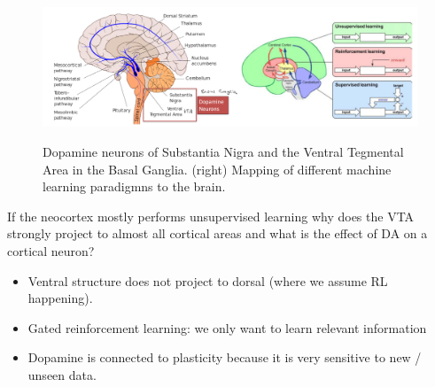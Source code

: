 \documentclass[main]{subfiles}
\begin{document}
  \begin{figure}[H]
	\centering
	\includegraphics[width=0.9\linewidth]{08_ReinforcementLearning/figures/rl-in-brain.png}
	\label{fig:rl-in-brain}
	\caption{Dopamine neurons of Substantia Nigra and the Ventral Tegmental Area in the Basal Ganglia. (right) Mapping of different machine learning paradigmns to the brain. }
\end{figure}

If the neocortex mostly performs unsupervised learning why does the VTA strongly project to almost all cortical areas and what is the effect of DA on a cortical neuron?

\begin{itemize}
    \item Ventral structure does not project to dorsal (where we assume RL happening).
    \item Gated reinforcement learning: we only want to learn relevant information
    \item Dopamine is connected to plasticity because it is very sensitive to new / unseen data.
\end{itemize}
\end{document}
